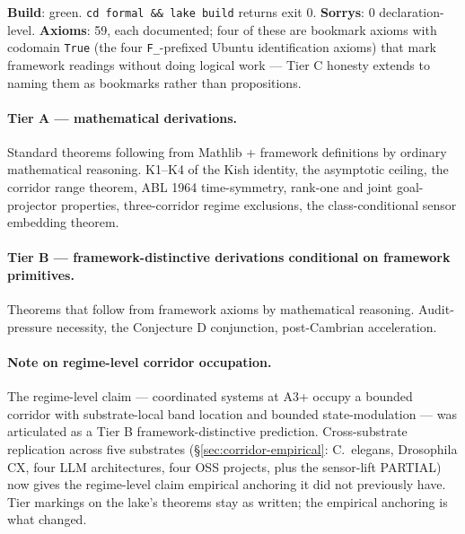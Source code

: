 \documentclass[11pt,a4paper]{article}
\begin{document}
\textbf{Build}: green. \texttt{cd formal \&\& lake build} returns exit 0. \textbf{Sorrys}: 0 declaration-level. \textbf{Axioms}: 59, each documented; four of these are bookmark axioms with codomain \texttt{True} (the four \texttt{F\_}-prefixed Ubuntu identification axioms) that mark framework readings without doing logical work --- Tier C honesty extends to naming them as bookmarks rather than propositions.

\paragraph{Tier A --- mathematical derivations.} Standard theorems following from Mathlib + framework definitions by ordinary mathematical reasoning. K1--K4 of the Kish identity, the asymptotic ceiling, the corridor range theorem, ABL 1964 time-symmetry, rank-one and joint goal-projector properties, three-corridor regime exclusions, the class-conditional sensor embedding theorem.

\paragraph{Tier B --- framework-distinctive derivations conditional on framework primitives.} Theorems that follow from framework axioms by mathematical reasoning. Audit-pressure necessity, the Conjecture D conjunction, post-Cambrian acceleration.

\paragraph{Note on regime-level corridor occupation.} The regime-level claim --- coordinated systems at A3+ occupy a bounded corridor with substrate-local band location and bounded state-modulation --- was articulated as a Tier B framework-distinctive prediction. Cross-substrate replication across five substrates (\S\ref{sec:corridor-empirical}: C.~elegans, Drosophila CX, four LLM architectures, four OSS projects, plus the sensor-lift PARTIAL) now gives the regime-level claim empirical anchoring it did not previously have. Tier markings on the lake's theorems stay as written; the empirical anchoring is what changed.
\end{document}
